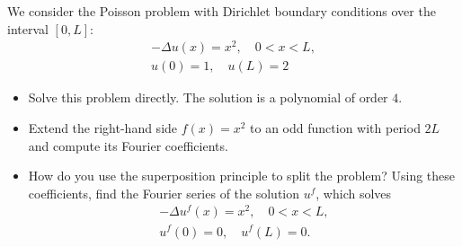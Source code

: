 \documentclass[11pt]{article}
\begin{document}
\begin{exercise}
    We consider the Poisson problem with Dirichlet boundary conditions over the interval $[0,L]$:
    \begin{gather*}
        - \Delta u(x) = x^2, \quad 0 < x < L,
        \\
        u(0) = 1, \quad u(L) = 2
    \end{gather*}
    \begin{itemize}
        \item Solve this problem directly. The solution is a polynomial of order $4$.
        \item Extend the right-hand side $f(x) = x^2$ to an odd function with period $2L$ and compute its Fourier coefficients.
        \item How do you use the superposition principle to split the problem? Using these coefficients, find the Fourier series of the solution $u^f$,
        which solves 
        \begin{gather*}
            - \Delta u^f(x) = x^2, \quad 0 < x < L,
            \\
            u^f(0) = 0, \quad u^f(L) = 0.
        \end{gather*}
    \end{itemize}
\end{exercise}
\end{document}
